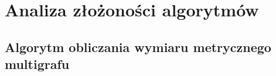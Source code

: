 \section{Analiza złożoności algorytmów}


\subsection{Algorytm obliczania wymiaru metrycznego multigrafu} %
